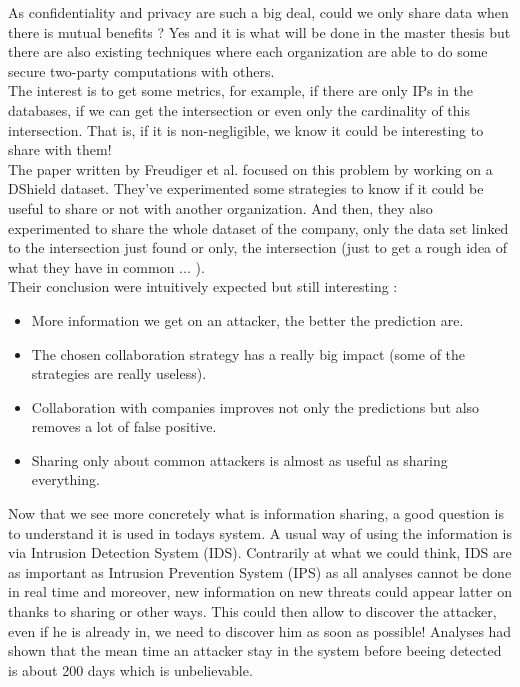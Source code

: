 \documentclass{eplmastersthesis}
\begin{document}
As confidentiality and privacy are such a big deal, could we only share data when there is mutual benefits ? Yes and it is what will be done in the master thesis but there are also existing techniques where each organization are able to do some secure two-party computations with others.\\
The interest is to get some metrics, for example, if there are only IPs in the databases, if we can get the intersection or even only the cardinality of this intersection. That is, if it is non-negligible, we know it could be interesting to share with them!\\
The paper written by Freudiger et al.\cite{freudiger2015controlled} focused on this problem by working on a DShield dataset. They've experimented some strategies to know if it could be useful to share or not with another organization. And then, they also experimented to share the whole dataset of the company, only the data set linked to the intersection just found or only, the intersection (just to get a rough idea of what they have in common ... ).\\
Their conclusion were intuitively expected but still interesting :
\begin{itemize}
\item More information we get on an attacker, the better the prediction are.
\item The chosen collaboration strategy has a really big impact (some of the strategies are really useless).
\item Collaboration with companies improves not only the predictions but also removes a lot of false positive.
\item Sharing only about common attackers is almost as useful as sharing everything.
\end{itemize}


Now that we see more concretely what is information sharing, a good question is to understand it is used in todays system. A usual way of using the information is via Intrusion Detection System (IDS). Contrarily at what we could think, IDS are as important as Intrusion Prevention System (IPS) as all analyses cannot be done in real time and moreover, new information on new threats could appear latter on thanks to sharing or other ways. This could then allow to discover the attacker, even if he is already in, we need to discover him as soon as possible! Analyses had shown that the mean time an attacker stay in the system before beeing detected is about 200 days which is unbelievable.
\end{document}
